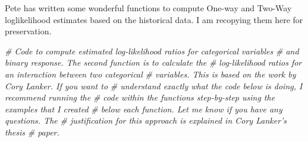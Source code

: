 \documentclass[10pt]{report}
\newenvironment{Shaded}{}{}
\newcommand{\CommentTok}[1]{\textcolor[rgb]{0.38,0.63,0.69}{\textit{{#1}}}}
\begin{document}
Pete has written some wonderful functions to compute One-way and Two-Way
loglikelihood estimates based on the historical data. I am recopying
them here for preservation.

\begin{Shaded}
\begin{Highlighting}[]
\CommentTok{# Code to compute estimated log-likelihood ratios for categorical variables}
\CommentTok{# and binary response. The second function is to calculate the}
\CommentTok{# log-likelihood ratios for an interaction between two categorical}
\CommentTok{# variables.  This is based on the work by Cory Lanker.  If you want to}
\CommentTok{# understand exactly what the code below is doing, I recommend running the}
\CommentTok{# code within the functions step-by-step using the examples that I created}
\CommentTok{# below each function. Let me know if you have any questions. The}
\CommentTok{# justification for this approach is explained in Cory Lanker's thesis}
\CommentTok{# paper.}


\end{Highlighting}
\end{Shaded}
\end{document}
